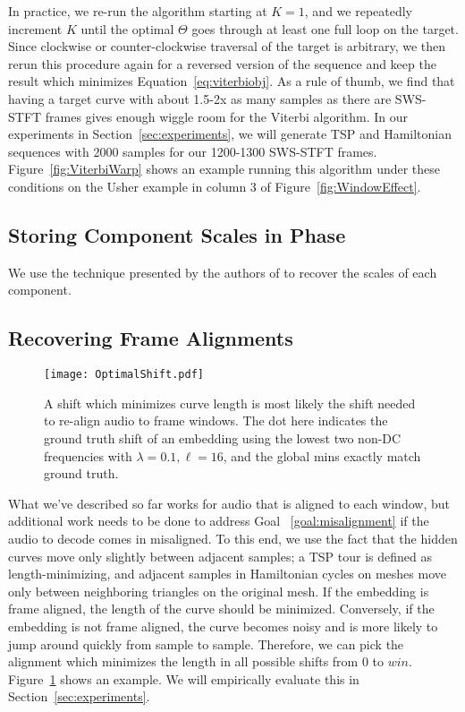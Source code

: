 \documentclass[runningheads]{llncs}
\begin{document}
In practice, we re-run the algorithm starting at $K = 1$, and we repeatedly increment $K$ until the optimal $\Theta$ goes through at least one full loop on the target.  Since clockwise or counter-clockwise traversal of the target is arbitrary, we then rerun this procedure again for a reversed version of the sequence and keep the result which minimizes Equation~\ref{eq:viterbiobj}.  As a rule of thumb, we find that having a target curve with about 1.5-2x as many samples as there are SWS-STFT frames gives enough wiggle room for the Viterbi algorithm.  In our experiments in Section~\ref{sec:experiments}, we will generate TSP and Hamiltonian sequences with 2000 samples for our 1200-1300 SWS-STFT frames.  Figure~\ref{fig:ViterbiWarp} shows an example running this algorithm under these conditions on the Usher example in column 3 of Figure~\ref{fig:WindowEffect}.







\subsection{Storing Component Scales in Phase}
\label{sec:componentscales}

We use the technique presented by the authors of \cite{xiaoxiao_dong_data_2004} to recover the scales of each component.

\subsection{Recovering Frame Alignments}

\begin{figure}
  \centering
  \texttt{[image: OptimalShift.pdf]}
  \caption{A shift which minimizes curve length is most likely the shift needed to re-align audio to frame windows.  The dot here indicates the ground truth shift of an embedding using the lowest two non-DC frequencies with $\lambda=0.1, \ell=16$, and the global mins exactly match ground truth.}
  \label{fig:FrameAlignments}
\end{figure}

What we've described so far works for audio that is aligned to each window, but additional work needs to be done to address Goal ~\ref{goal:misalignment} if the audio to decode comes in misaligned.  To this end, we use the fact that the hidden curves move only slightly between adjacent samples; a TSP tour is defined as length-minimizing, and adjacent samples in Hamiltonian cycles on meshes move only between neighboring triangles on the original mesh.  If the embedding is frame aligned, the length of the curve should be minimized.  Conversely, if the embedding is not frame aligned, the curve becomes noisy and is more likely to jump around quickly from sample to sample.  Therefore, we can pick the alignment which minimizes the length in all possible shifts from $0$ to $win$.  Figure~\ref{fig:FrameAlignments} shows an example.  We will empirically evaluate this in Section~\ref{sec:experiments}.
\end{document}
